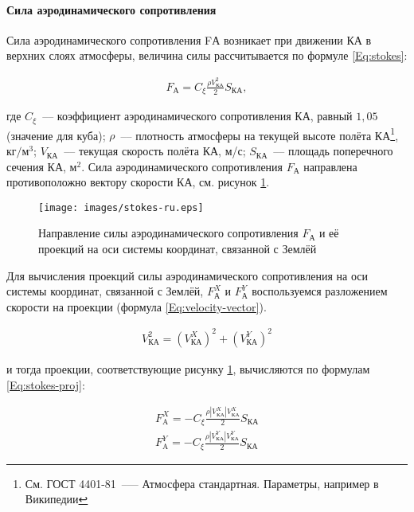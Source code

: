 \documentclass[12pt,a4paper]{article}
\begin{document}
\paragraph{Сила аэродинамического сопротивления}

Сила аэродинамического сопротивления FА возникает при движении КА в верхних слоях
атмосферы, величина силы рассчитывается по формуле \ref{Eq:stokes}:

\begin{eqnarray}
  F_{\text{А}} = C_\xi \frac{\rho V_{\text{КА}}^2}{2} S_{\text{КА}}, \label{Eq:stokes}
\end{eqnarray}

где $C_\xi$~--– коэффициент аэродинамического сопротивления КА, равный $1,05$ (значение
для куба); $\rho$~--– плотность атмосферы на текущей высоте полёта КА\footnote{См. ГОСТ
  4401-81~--— Атмосфера стандартная. Параметры, например в Википедии},
$\text{кг}/\text{м}^3$; $V_{\text{КА}}$~--– текущая скорость полёта КА, м/с;
$S_{\text{КА}}$~--– площадь поперечного сечения КА, $\text{м}^2$. Сила аэродинамического
сопротивления $F_{\text{А}}$ направлена противоположно вектору скорости КА, см. рисунок
\ref{Pic:Stokes}.

\begin{figure}[tbh]
  \begin{center}
    \texttt{[image: images/stokes-ru.eps]}
    \caption{Направление силы аэродинамического сопротивления $F_{\text{А}}$ и её проекций
      на оси системы координат, связанной с Землёй}
    \label{Pic:Stokes}
  \end{center}
\end{figure}

Для вычисления проекций силы аэродинамического сопротивления на оси системы координат, связанной с
Землёй, $F_{\text{А}}^X$ и $F_{\text{А}}^Y$ воспользуемся разложением скорости на проекции
(формула \ref{Eq:velocity-vector}).

\begin{eqnarray}
  V_{\text{КА}}^2 = \left( V_{\text{КА}}^X \right)^2 + \left( V_{\text{КА}}^Y \right)^2
  \label{Eq:velocity-vector}
\end{eqnarray}

и тогда проекции, соответствующие рисунку \ref{Pic:Stokes}, вычисляются по формулам
\ref{Eq:stokes-proj}:

\begin{eqnarray}
  F_{\text{A}}^X = - C_\xi \frac{\rho \left| V_{\text{КА}}^X \right| V_{\text{КА}}^X}{2} S_{\text{КА}} \nonumber \\
  F_{\text{A}}^Y = - C_\xi \frac{\rho \left| V_{\text{КА}}^Y \right| V_{\text{КА}}^Y}{2} S_{\text{КА}} \label{Eq:stokes-proj}
\end{eqnarray}
\end{document}
